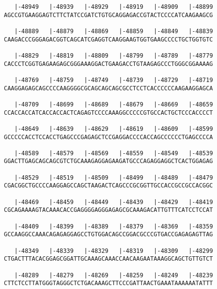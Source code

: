 \documentclass{article}
\begin{document}
\begin{Verbatim}
   |-48949   |-48939   |-48929   |-48919   |-48909   |-48899
AGCCGTGAAGGAGTCTTCTATCCGATCTGTGCAGGAGACCGTACTCCCCATCAAGAAGCG
                                                            
   |-48889   |-48879   |-48869   |-48859   |-48849   |-48839
CAAGACCCGGGAGACGGTCAGCATCGAGGTCAAGGAAGTGGTGAAGCCCCTGCTGGTGTC
                                                            
   |-48829   |-48819   |-48809   |-48799   |-48789   |-48779
CACCCTCGGTGAGAAGAGCGGGAAAGGACTGAAGACCTGTAAGAGCCCTGGGCGGAAAAG
                                                            
   |-48769   |-48759   |-48749   |-48739   |-48729   |-48719
CAAGGAGAGCAGCCCCAAGGGGCGCAGCAGCAGCGCCTCCTCACCCCCCAAGAAGGAGCA
                                                            
   |-48709   |-48699   |-48689   |-48679   |-48669   |-48659
CCACCACCATCACCACCACTCAGAGTCCCCAAAGGCCCCCGTGCCACTGCTCCCACCCCT
                                                            
   |-48649   |-48639   |-48629   |-48619   |-48609   |-48599
GCCCCCACCTCCACCTGAGCCCGAGAGCTCCGAGGACCCCACCAGCCCCCCTGAGCCCCA
                                                            
   |-48589   |-48579   |-48569   |-48559   |-48549   |-48539
GGACTTGAGCAGCAGCGTCTGCAAAGAGGAGAAGATGCCCAGAGGAGGCTCACTGGAGAG
                                                            
   |-48529   |-48519   |-48509   |-48499   |-48489   |-48479
CGACGGCTGCCCCAAGGAGCCAGCTAAGACTCAGCCCGCGGTTGCCACCGCCGCCACGGC
                                                            
   |-48469   |-48459   |-48449   |-48439   |-48429   |-48419
CGCAGAAAAGTACAAACACCGAGGGGAGGGAGAGCGCAAAGACATTGTTTCATCCTCCAT
                                                            
   |-48409   |-48399   |-48389   |-48379   |-48369   |-48359
GCCAAGGCCAAACAGAGAGGAGCCTGTGGACAGCCGGACGCCCGTGACCGAGAGAGTTAG
                                                            
   |-48349   |-48339   |-48329   |-48319   |-48309   |-48299
CTGACTTTACACGGAGCGGATTGCAAAGCAAACCAACAAGAATAAAGGCAGCTGTTGTCT
                                                            
   |-48289   |-48279   |-48269   |-48259   |-48249   |-48239
CTTCTCCTTATGGGTAGGGCTCTGACAAAGCTTCCCGATTAACTGAAATAAAAAATATTT
                                                            

\end{Verbatim}
\end{document}
